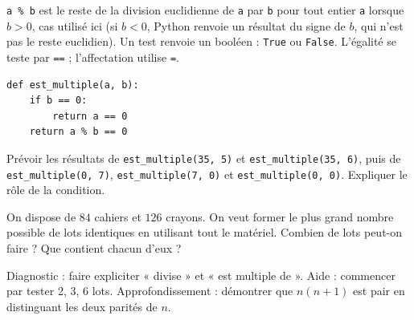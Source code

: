 \begin{method}
\texttt{a \% b} est le reste de la division euclidienne de \texttt{a} par \texttt{b} pour tout entier \texttt{a} lorsque $b>0$, cas utilisé ici (si $b<0$, Python renvoie un résultat du signe de $b$, qui n'est pas le reste euclidien). Un test renvoie un booléen : \texttt{True} ou \texttt{False}. L'égalité se teste par \texttt{==} ; l'affectation utilise \texttt{=}.
\end{method}
\begin{lstlisting}
def est_multiple(a, b):
    if b == 0:
        return a == 0
    return a % b == 0
\end{lstlisting}
\begin{example}Prévoir les résultats de \texttt{est\_multiple(35, 5)} et \texttt{est\_multiple(35, 6)}, puis de \texttt{est\_multiple(0, 7)}, \texttt{est\_multiple(7, 0)} et \texttt{est\_multiple(0, 0)}. Expliquer le rôle de la condition.\end{example}
\begin{example}[Problème]On dispose de $84$ cahiers et $126$ crayons. On veut former le plus grand nombre possible de lots identiques en utilisant tout le matériel. Combien de lots peut-on faire ? Que contient chacun d'eux ?\end{example}
\begin{teachernote}Diagnostic : faire expliciter « divise » et « est multiple de ». Aide : commencer par tester 2, 3, 6 lots. Approfondissement : démontrer que $n(n+1)$ est pair en distinguant les deux parités de $n$.\end{teachernote}
